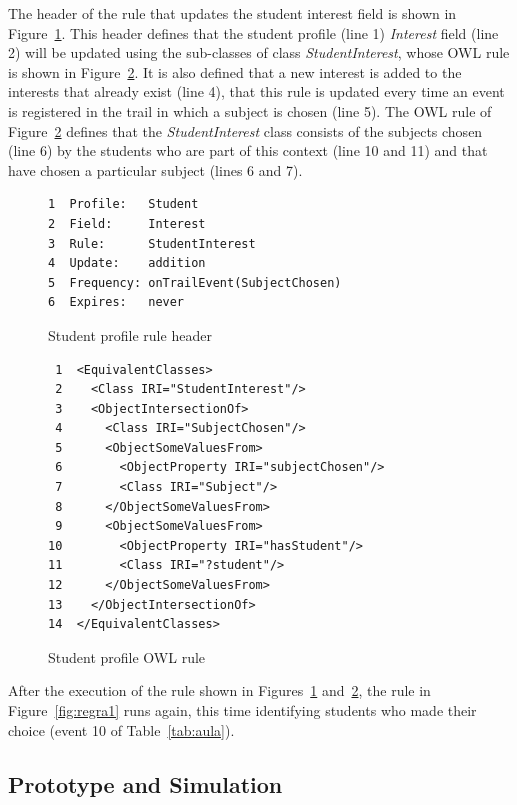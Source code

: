 \documentclass{svjour3}                     %
\begin{document}
The header of the rule that updates the student interest field is shown in Figure~\ref{fig:regra3}. This header defines that the student profile (line 1) {\em Interest} field (line 2) will be updated using the sub-classes of class {\em StudentInterest}, whose OWL rule is shown in Figure~\ref{fig:regra2}. It is also defined that a new interest is added to the interests that already exist (line 4), that this rule is updated every time an event is registered in the trail in which a subject is chosen (line 5). The OWL rule of Figure~\ref{fig:regra2} defines that the {\em StudentInterest} class consists of the subjects chosen (line 6) by the students who are part of this context (line 10 and 11) and that have chosen a particular subject (lines 6 and 7).

\begin{figure}[!t]
\begin{verbatim}
1  Profile:   Student
2  Field:     Interest
3  Rule:      StudentInterest
4  Update:    addition
5  Frequency: onTrailEvent(SubjectChosen)
6  Expires:   never
\end{verbatim}
  \caption{Student profile rule header}
  \label{fig:regra3}
\end{figure}

\begin{figure}[!t]
\begin{verbatim}
 1  <EquivalentClasses>
 2    <Class IRI="StudentInterest"/>
 3    <ObjectIntersectionOf>
 4      <Class IRI="SubjectChosen"/>
 5      <ObjectSomeValuesFrom>
 6        <ObjectProperty IRI="subjectChosen"/>
 7        <Class IRI="Subject"/>
 8      </ObjectSomeValuesFrom>
 9      <ObjectSomeValuesFrom>
10        <ObjectProperty IRI="hasStudent"/>
11        <Class IRI="?student"/>
12      </ObjectSomeValuesFrom>
13    </ObjectIntersectionOf>
14  </EquivalentClasses>
\end{verbatim}
  \caption{Student profile OWL rule}
  \label{fig:regra2}
\end{figure}

After the execution of the rule shown in Figures~\ref{fig:regra3} and~\ref{fig:regra2}, the rule in Figure~\ref{fig:regra1} runs again, this time identifying students who made their choice (event 10 of Table~\ref{tab:aula}).


\subsection{Prototype and Simulation}
\label{sec:simulacao_cen1}
\end{document}
